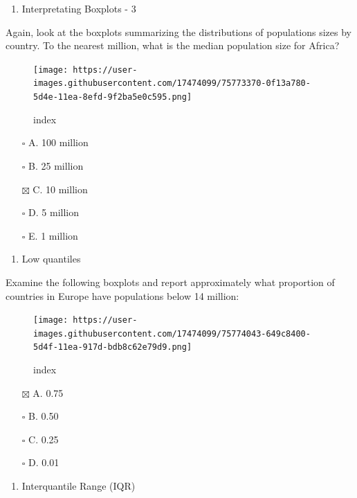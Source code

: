 \documentclass[
]{article}
\providecommand{\tightlist}{%
  \setlength{\itemsep}{0pt}\setlength{\parskip}{0pt}}
\begin{document}
\begin{enumerate}
\def\labelenumi{\arabic{enumi}.}
\setcounter{enumi}{4}
\tightlist
\item
  Interpretating Boxplots - 3
\end{enumerate}

Again, look at the boxplots summarizing the distributions of populations
sizes by country. To the nearest million, what is the median population
size for Africa?

\begin{figure}
\centering
\texttt{[image: https://user-images.githubusercontent.com/17474099/75773370-0f13a780-5d4e-11ea-8efd-9f2ba5e0c595.png]}
\caption{index}
\end{figure}

\begin{itemize}
\tightlist
\item[$\square$]
  A. 100 million
\item[$\square$]
  B. 25 million
\item[$\boxtimes$]
  C. 10 million
\item[$\square$]
  D. 5 million
\item[$\square$]
  E. 1 million
\end{itemize}

\begin{enumerate}
\def\labelenumi{\arabic{enumi}.}
\setcounter{enumi}{5}
\tightlist
\item
  Low quantiles
\end{enumerate}

Examine the following boxplots and report approximately what proportion
of countries in Europe have populations below 14 million:

\begin{figure}
\centering
\texttt{[image: https://user-images.githubusercontent.com/17474099/75774043-649c8400-5d4f-11ea-917d-bdb8c62e79d9.png]}
\caption{index}
\end{figure}

\begin{itemize}
\tightlist
\item[$\boxtimes$]
  A. 0.75
\item[$\square$]
  B. 0.50
\item[$\square$]
  C. 0.25
\item[$\square$]
  D. 0.01
\end{itemize}

\begin{enumerate}
\def\labelenumi{\arabic{enumi}.}
\setcounter{enumi}{6}
\tightlist
\item
  Interquantile Range (IQR)
\end{enumerate}
\end{document}
